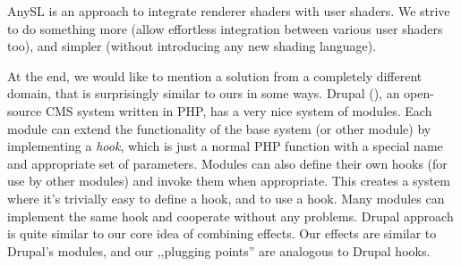 \documentclass{egpubl}
\begin{document}
AnySL \cite{anysl} is an approach to integrate renderer
shaders with user shaders. We strive to do something more (allow effortless
integration between various user shaders too), and simpler (without
introducing any new shading language).

At the end, we would like to mention a solution from a completely
different domain, that is surprisingly similar to ours in some ways.
Drupal (),
an open-source CMS system written in PHP,
has a very nice system of modules. Each module
can extend the functionality of the base system (or other module)
by implementing a \textit{hook}, which is just a normal PHP function
with a special name and appropriate set of parameters. Modules can also define
their own hooks (for use by other modules) and invoke them when appropriate.
This creates a system where it's trivially easy to define a hook,
and to use a hook.
Many modules can implement the same hook and cooperate without any problems.
Drupal approach is quite similar to our
core idea of combining effects. Our effects are similar to
Drupal's modules, and our ,,plugging points'' are analogous to Drupal hooks.


%
%
\end{document}

